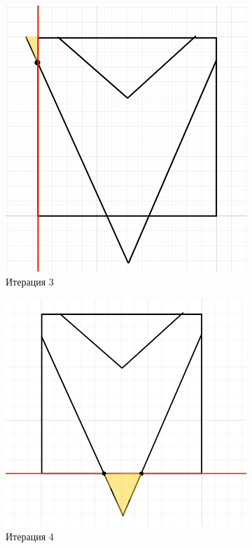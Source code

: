 \begin{figure}[H]
    \centering
    \begin{subfigure}[b]{0.425\linewidth}
        \centering
        \includegraphics[width=\linewidth]{screen_3.png}
        \caption{Итерация 3}
        \label{fig:iter3}
    \end{subfigure}
    \hfill
    \begin{subfigure}[b]{0.5\linewidth}
        \centering
        \includegraphics[width=\linewidth]{screen_4.png}
        \caption{Итерация 4}
        \label{fig:iter4}
    \end{subfigure}
    \caption{}
    \label{fig:pair_iter3_iter4}
\end{figure}

